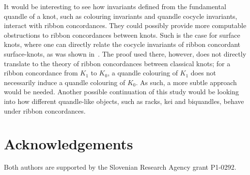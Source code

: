 \documentclass[a4paper,12pt]{amsart}
\numberwithin{equation}{section}
\theoremstyle{plain}
\theoremstyle{definition}
\begin{document}
It would be interesting to see how invariants defined from the fundamental quandle of a knot, such as colouring invariants and
quandle cocycle invariants, interact with ribbon concordances. They could possibly provide more computable obstructions to ribbon
concordances between knots. Such is the case for surface knots, where one can directly relate the cocycle invariants of 
ribbon concordant surface-knots, as was shown in~\cite{CKS3}. The proof used there, however, does not
directly translate to the theory of ribbon concordances between classical knots; for a ribbon concordance from $K_1$ to $K_0$, a quandle colouring
of $K_1$ does not necessarily induce a quandle colouring of $K_0$. As such, a more subtle approach would be needed.
Another possible continuation of this study would be looking into how different quandle-like objects, such as racks, kei and biquandles, behave 
under ribbon concordances.



\section*{Acknowledgements}
Both authors are supported by the Slovenian Research Agency grant P1-0292.
\end{document}
